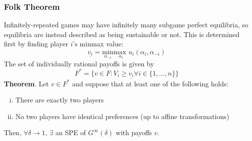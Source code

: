 \documentclass{article}
\begin{document}
\subsubsection{Folk Theorem}
Infinitely-repeated games may have infinitely many subgame perfect equilibria, so equilibria are instead described as being sustainable or not. This is determined first by finding player $i$'s minmax value:
\[
	\underline{v_i} = \underset{\alpha_{-i}}{\text{min}}\underset{\alpha_i}{\text{max }}u_i(\alpha_i,\alpha_{-i})
\]
The set of individually rational payoffs is given by
\[
	F^* = \{v\in F: V_i\geq \underline{v_i}\forall i \in \{1,...,n\}\}
\]
\textbf{Theorem}. Let $v\in F^*$ and suppose that at least one of the following holds:
	\begin{enumerate}[(i)]
		\item There are exactly two players 
		\item No two players have identical preferences (up to affine transformations)
	\end{enumerate}
Then, ${\forall\delta\rightarrow 1}$, $\exists$ an SPE of $G^{\infty}(\delta)$ with payoffs $v$.
\end{document}
